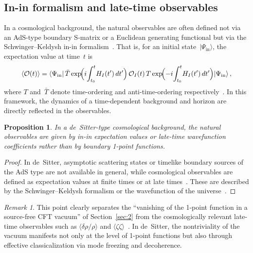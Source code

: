 \documentclass[
  aps,
  prd,
  preprint,
  groupedaddress,
  nofootinbib,
  longbibliography
]{revtex4-2}
\newtheorem{proposition}[definition]{Proposition}
\theoremstyle{remark}
\newtheorem{remark}[definition]{Remark}
\begin{document}
\subsection{In-in formalism and late-time observables}%
  \label{subsec:4-5}

In a cosmological background, the natural observables are often
defined not via an AdS-type boundary S-matrix or a Euclidean
generating functional but via the Schwinger--Keldysh in-in
formalism~\cite{ref24,ref25}.
That is, for an initial state~$|\Psi_{\mathrm{in}}\rangle$,
the expectation value at time~$t$ is
\begin{equation}\label{eq:in-in}
  \langle\mathcal{O}(t)\rangle
  = \langle\Psi_{\mathrm{in}}|\,
    \bar{T}\exp\!\Bigl(i\!\int_{t_0}^{t}\!H_I(t')\,dt'\Bigr)\,
    \mathcal{O}_I(t)\,
    T\exp\!\Bigl(-i\!\int_{t_0}^{t}\!H_I(t')\,dt'\Bigr)
    |\Psi_{\mathrm{in}}\rangle\,,
\end{equation}
where $T$ and~$\bar{T}$ denote time-ordering and
anti-time-ordering respectively~\cite{ref24,ref25}.
In this framework, the dynamics of a time-dependent background
and horizon are directly reflected in the observables.

\begin{proposition}\label{prop:in-in}
In a de~Sitter-type cosmological background, the natural
observables are given by in-in expectation values or late-time
wavefunction coefficients rather than by boundary 1-point
functions.
\end{proposition}

\begin{proof}
In de~Sitter, asymptotic scattering states or timelike boundary
sources of the AdS type are not available in general, while
cosmological observables are defined as expectation values at
finite times or at late
times~\cite{ref19,ref20,ref21}.
These are described by the Schwinger--Keldysh formalism or the
wavefunction of the universe~\cite{ref24,ref25}.
\end{proof}

\begin{remark}\label{rem:late-time}
This point clearly separates the ``vanishing of the 1-point
function in a source-free CFT vacuum'' of Section~\ref{sec:2}
from the cosmologically relevant late-time observables such as
$\langle\delta\rho/\rho\rangle$ and
$\langle\zeta\zeta\rangle$~\cite{ref24,ref25}.
In de~Sitter, the nontriviality of the vacuum manifests not only
at the level of 1-point functions but also through effective
classicalization via mode freezing and decoherence.
\end{remark}
\end{document}

